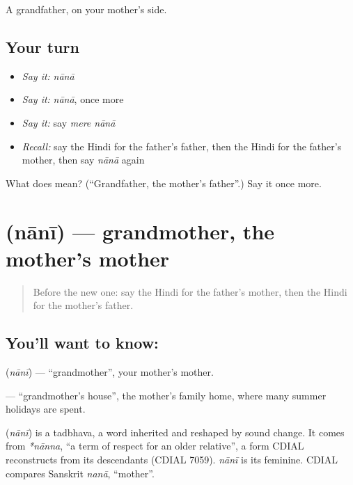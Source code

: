 \begin{grammarlens}[title={What you've built}]
A grandfather, on your mother's side.
\end{grammarlens}

\subsection*{Your turn}
\begin{itemize}
\raggedright
  \item \emph{Say it:} \emph{nānā}
  \item \emph{Say it:} \emph{nānā}, once more
  \item \emph{Say it:} say \emph{mere nānā}
  \item \emph{Recall:} say the Hindi for the father's father, then the Hindi for the father's mother, then say \emph{nānā} again
\end{itemize}

\begin{tcolorbox}[breakable,colback=teal!4,colframe=teal!35!black,title={Before you move on}]
What does  mean? (\textquotedblleft{}Grandfather, the mother's father\textquotedblright{}.) Say it once more.
\end{tcolorbox}
\section[\texorpdfstring{\hi{नानी} (nānī)}{नानी (nānī)}]{ (nānī) — grandmother, the mother's mother}

\label{lesson:HI-C116-nani}



\begin{quote}
Before the new one: say the Hindi for the father's mother, then the Hindi for the mother's father.
\end{quote}

\subsection*{You'll want to know: }
\textbf{} (\emph{nānī}) — \textquotedblleft{}grandmother\textquotedblright{}, your mother's mother.

\textbf{  } — \textquotedblleft{}grandmother's house\textquotedblright{}, the mother's family home, where many summer holidays are spent.

\begin{cousinweb}
\textbf{} (\emph{nānī}) is a tadbhava, a word inherited and reshaped by sound change. It comes from \emph{*nānna}, \textquotedblleft{}a term of respect for an older relative\textquotedblright{}, a form CDIAL reconstructs from its descendants (CDIAL 7059). \emph{nānī} is its feminine. CDIAL compares Sanskrit \emph{nanā}, \textquotedblleft{}mother\textquotedblright{}.
\end{cousinweb}

